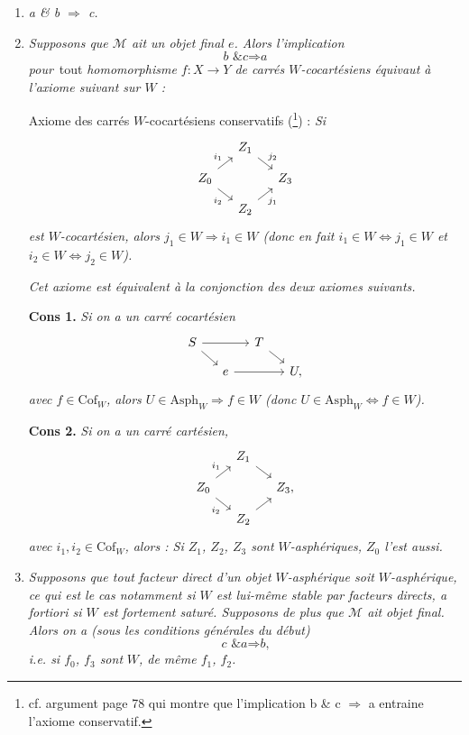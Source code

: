 \documentclass[11pt]{article}
\newcommand{\printedpage}[1]{\marginpar{\footnotesize p.~#1}}
\newcommand{\msp}[1]{\marginpar{\footnotesize [#1]}}
\newcommand{\Asph}{\mathrm{Asph}}
\newcommand{\Cof}{\mathrm{Cof}}
\begin{document}
\begin{enumerate}
\item[\textit{1°)}] \textit{a \& b $\Longrightarrow$ c.}

\msp{page 273}

\item[\textit{2°)}] \textit{Supposons que $\mathcal{M}$ ait un objet final $e$. Alors l'implication}
\[
\textit{b \& c} \Longrightarrow \textit{a}
\]
\textit{pour}~tout \textit{homomorphisme $f : X \longrightarrow Y$ de carrés $W$-cocartésiens équivaut à l'axiome suivant sur $W$ :}

Axiome des carrés $W$-cocartésiens conservatifs (\footnote{cf. argument page 78 qui montre que l'implication b \& c $\Longrightarrow$ a entraine l'axiome conservatif.}) : \textit{Si}
\[
\begin{tikzcd}[ampersand replacement=\&, column sep=small, row sep=small]
 \& Z_1 \arrow[dr, "j_2"] \& \\
Z_0 \arrow[ur, "i_1"] \arrow[dr, "i_2"'] \& \& Z_3 \\
 \& Z_2 \arrow[ur, "j_1"'] \&
\end{tikzcd}
\]
\textit{est $W$-cocartésien, alors $j_1 \in W \Longrightarrow i_1 \in W$ (donc en fait $i_1 \in W \Longleftrightarrow j_1 \in W$ et $i_2 \in W \Longleftrightarrow j_2 \in W$).}

\textit{Cet axiome est équivalent à la conjonction des deux axiomes suivants.}

\textbf{Cons 1.} \textit{Si on a un carré cocartésien}
\printedpage{178}
\[
\begin{tikzcd}[ampersand replacement=\&, column sep=small, row sep=small]
S \arrow[rr] \arrow[dr] \& \& T \arrow[dr] \& \\
 \& e \arrow[rr] \& \& U,
\end{tikzcd}
\]
\textit{avec $f \in \Cof_W$, alors $U \in \Asph_W \Longrightarrow f \in W$ (donc $U \in \Asph_W \Longleftrightarrow f \in W$).}

\textbf{Cons 2.} \textit{Si on a un carré cartésien,}
\[
\begin{tikzcd}[ampersand replacement=\&, column sep=small, row sep=small]
 \& Z_1 \arrow[dr] \& \\
Z_0 \arrow[ur, "i_1"] \arrow[dr, "i_2"'] \& \& Z_3, \\
 \& Z_2 \arrow[ur] \&
\end{tikzcd}
\]
\textit{avec $i_1, i_2 \in \Cof_W$, alors : Si $Z_1$, $Z_2$, $Z_3$ sont $W$-asphériques, $Z_0$ l'est aussi.}

\msp{page 274}

\item[\textit{3°)}] \textit{Supposons que tout facteur direct d'un objet $W$-asphérique soit $W$-asphérique, ce qui est le cas notamment si $W$ est lui-même stable par facteurs directs, a fortiori si $W$ est fortement saturé. Supposons de plus que $\mathcal{M}$ ait} \textit{objet final. Alors on a (sous les conditions générales du début)}
\[
\textit{c \& a} \Longrightarrow \textit{b,}
\]
\textit{i.e. si $f_0$, $f_3$ sont} \textit{$W$, de même $f_1$, $f_2$.}
\end{enumerate}
\end{document}
